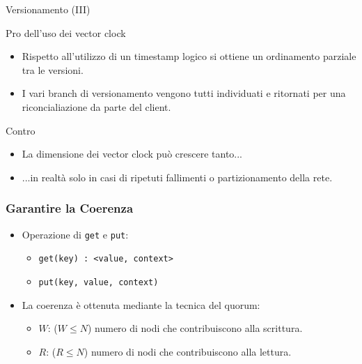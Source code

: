 \begin{frame}{Versionamento (III)}
  \begin{block}{Pro dell'uso dei vector clock}
    \begin{itemize}
    \item Rispetto all'utilizzo di un timestamp logico si ottiene un ordinamento parziale tra le versioni.
    \item I vari branch di versionamento vengono tutti individuati e ritornati per una riconcialiazione da parte del client.
    \end{itemize}
  \end{block}

  \begin{block}{Contro}
    \begin{itemize}
    \item La dimensione dei vector clock può crescere tanto...
    \item ...in realtà solo in casi di ripetuti fallimenti o partizionamento della rete.
    \end{itemize}
  \end{block}
\end{frame}


\begin{frame}
  \frametitle{Garantire la Coerenza}
  \begin{itemize}
  \item Operazione di \texttt{get} e \texttt{put}:
    \begin{itemize}
    \item \texttt{get(key) : <value, context>}
    \item \texttt{put(key, value, context)}
    \end{itemize}
  \end{itemize}
  \begin{itemize}
  \item La coerenza è ottenuta mediante la tecnica del \alert{quorum}:
    \begin{itemize}
    \item $W$: ($W \leq N$) numero di nodi che contribuiscono alla scrittura.
    \item $R$: ($R \leq N$) numero di nodi che contribuiscono alla lettura.
    \end{itemize}
  \end{itemize}
\end{frame}


